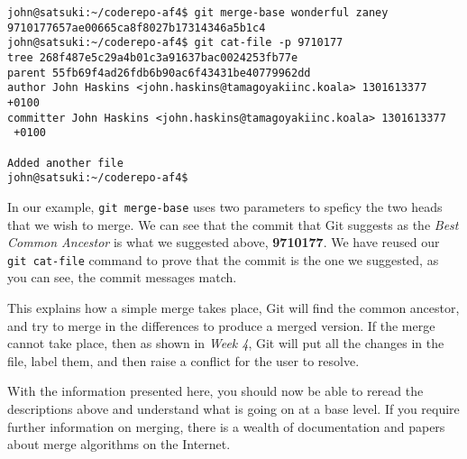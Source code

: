 \begin{Verbatim}
john@satsuki:~/coderepo-af4$ git merge-base wonderful zaney
9710177657ae00665ca8f8027b17314346a5b1c4
john@satsuki:~/coderepo-af4$ git cat-file -p 9710177
tree 268f487e5c29a4b01c3a91637bac0024253fb77e
parent 55fb69f4ad26fdb6b90ac6f43431be40779962dd
author John Haskins <john.haskins@tamagoyakiinc.koala> 1301613377 +0100
committer John Haskins <john.haskins@tamagoyakiinc.koala> 1301613377 
 +0100

Added another file
john@satsuki:~/coderepo-af4$ 
\end{Verbatim}

In our example, \texttt{git merge-base} uses two parameters to speficy the two heads that we wish to merge.  We can see that the commit that Git suggests as the \emph{Best Common Ancestor} is what we suggested above, \textbf{9710177}.  We have reused our \texttt{git cat-file} command to prove that the commit is the one we suggested, as you can see, the commit messages match.

This explains how a simple merge takes place, Git will find the common ancestor, and try to merge in the differences to produce a merged version.  If the merge cannot take place, then as shown in \emph{Week 4}, Git will put all the changes in the file, label them, and then raise a conflict for the user to resolve.  

With the information presented here, you should now be able to reread the descriptions above and understand what is going on at a base level.  If you require further information on merging, there is a wealth of documentation and papers about merge algorithms on the Internet.

